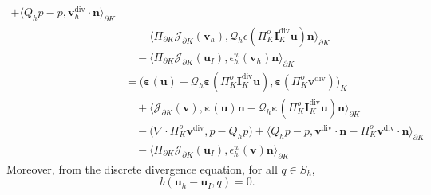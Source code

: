 \documentclass[review,hidelinks,onefignum,onetabnum]{siamart251216}
\begin{document}
\begin{equation}
\begin{aligned}
  + \langle Q_h p - p, \boldsymbol{v}_h^{\operatorname{div}} \cdot \boldsymbol{n} \rangle_{\partial K} \\
&\quad - \langle \Pi_{\partial K} \mathcal{J}_{\partial K}(\boldsymbol{v}_h), \mathcal{Q}_h \epsilon(\Pi_K^o \boldsymbol{I}_K^{\operatorname{div}} \boldsymbol{u})\boldsymbol{n} \rangle_{\partial K} \\
&\quad - \langle \Pi_{\partial K} \mathcal{J}_{\partial K}(\boldsymbol{u}_I), \epsilon_h^w(\boldsymbol{v}_h)\boldsymbol{n} \rangle_{\partial K}\\
&= \bigl( \boldsymbol{\varepsilon}(\boldsymbol{u}) - \mathcal{Q}_h \boldsymbol{\varepsilon}(\Pi_K^o \boldsymbol{I}_K^{\operatorname{div}} \boldsymbol{u}), \boldsymbol{\varepsilon}(\Pi_K^o \boldsymbol{v}^{\operatorname{div}}) \bigr)_K \\
&\quad + \bigl\langle \mathcal{J}_{\partial K}(\boldsymbol{v}), \boldsymbol{\varepsilon}(\boldsymbol{u})\boldsymbol{n} - \mathcal{Q}_h \boldsymbol{\varepsilon}(\Pi_K^o \boldsymbol{I}_K^{\operatorname{div}} \boldsymbol{u})\boldsymbol{n} \bigr\rangle_{\partial K} \\
&\quad - \bigl( \nabla \cdot \Pi_K^o \boldsymbol{v}^{\operatorname{div}}, p - Q_h p \bigr) 
      + \bigl\langle Q_h p - p, \boldsymbol{v}^{\operatorname{div}} \cdot \boldsymbol{n} - \Pi_K^o \boldsymbol{v}^{\operatorname{div}} \cdot \boldsymbol{n} \bigr\rangle_{\partial K} \\
&\quad - \bigl\langle \Pi_{\partial K} \mathcal{J}_{\partial K}(\boldsymbol{u}_I), \epsilon_h^w(\boldsymbol{v})\boldsymbol{n} \bigr\rangle_{\partial K}
\end{aligned}
\end{equation}
Moreover, from the discrete divergence equation, for all \(q \in S_h\),
\begin{equation}\label{eq:divergenceerror}
b(\boldsymbol{u}_h - \boldsymbol{u}_I, q) = 0.
\end{equation}
\end{document}
